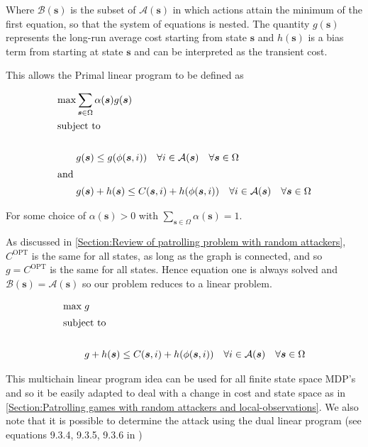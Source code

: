 \documentclass[a4paper,10pt]{article}
\theoremstyle{definition}
\theoremstyle{definition}
\theoremstyle{remark}
\theoremstyle{definition}
\begin{document}
Where $\mathcal{B}(\bm{s})$ is the subset of $\mathcal{A}(\bm{s})$ in which actions attain the minimum of the first equation, so that the system of equations is nested. The quantity $g(\bm{s})$ represents the long-run average cost starting from state $\bm{s}$ and $h(\bm{s})$ is a bias term from starting at state $\bm{s}$ and can be interpreted as the transient cost.

This allows the Primal linear program to be defined as

\begin{align*}
\max &\sum\limits_{\bm{s} \in \Omega} \alpha(\bm{s})g(\bm{s}) \\
\intertext{subject to} \\
&g(\bm{s}) \leq g(\phi(\bm{s},i))  \quad \forall i \in \mathcal{A}(\bm{s}) \quad \forall \bm{s} \in \Omega \\
\intertext{and}
&g(\bm{s})+h(\bm{s}) \leq C(\bm{s},i) + h(\phi(\bm{s},i)) \quad \forall i \in \mathcal{A}(\bm{s}) \quad \forall \bm{s} \in \Omega
\end{align*}

For some choice of $\alpha(\bm{s}) >0$ with $\sum\limits_{\bm{s} \in \Omega} \alpha(\bm{s}) = 1 $.

As discussed in \ref{Section:Review of patrolling problem with random attackers}, $C^{\text{OPT}}$ is the same for all states, as long as the graph is connected, and so $g=C^{\text{OPT}}$ is the same for all states. Hence equation one is always solved and $\mathcal{B}(\bm{s})=\mathcal{A}(\bm{s})$ so our problem reduces to a linear problem.

\begin{align*}
\max  \;  &g \\
\intertext{subject to} \\
&g+h(\bm{s}) \leq C(\bm{s},i) + h(\phi(\bm{s},i)) \quad \forall i \in \mathcal{A}(\bm{s}) \quad \forall \bm{s} \in \Omega
\end{align*}

This multichain linear program idea can be used for all finite state space MDP's and so it be easily adapted to deal with a change in cost and state space as in \ref{Section:Patrolling games with random attackers and local-observations}. We also note that it is possible to determine the attack using the dual linear program (see equations 9.3.4, 9.3.5, 9.3.6 in \cite{Puterman1994})
\end{document}
